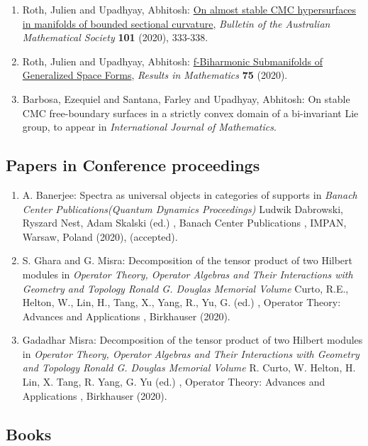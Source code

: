 \begin{enumerate}
\item Roth, Julien and Upadhyay, Abhitosh: \href{https://www.cambridge.org/core/journals/bulletin-of-the-australian-mathematical-society/article/on-almost-stable-cmc-hypersurfaces-in-manifolds-of-bounded-sectional-curvature/E0BF84D4D46C82F6D75CDCEAAF5DEE94}{On almost stable CMC hypersurfaces in manifolds of bounded sectional curvature}, \emph{Bulletin of the Australian Mathematical Society} {\bf 101} (2020), 333-338.
\item Roth, Julien and Upadhyay, Abhitosh: \href{https://link.springer.com/article/10.1007/s00025-019-1142-4?shared-article-renderer#citeas}{f-Biharmonic Submanifolds of Generalized Space Forms}, \emph{Results in Mathematics} {\bf 75} (2020).
\item Barbosa, Ezequiel and Santana, Farley and Upadhyay, Abhitosh: On stable CMC free-boundary surfaces in a strictly convex domain of a bi-invariant Lie group, to appear in \emph{International Journal of Mathematics}.
\end{enumerate}


\subsection{Papers in Conference proceedings}

\begin{enumerate}
\item A. Banerjee: Spectra as universal objects in categories of supports in {\em Banach Center Publications(Quantum Dynamics Proceedings)} Ludwik Dabrowski, Ryszard Nest, Adam Skalski (ed.) , Banach Center Publications , IMPAN, Warsaw, Poland (2020), (accepted).
\item S. Ghara and G. Misra: Decomposition of the tensor product of two Hilbert modules in {\em Operator Theory, Operator Algebras and Their Interactions with Geometry and Topology Ronald G. Douglas Memorial Volume} Curto, R.E., Helton, W., Lin, H., Tang, X., Yang, R., Yu, G. (ed.) , Operator Theory: Advances and Applications , Birkhauser (2020).
\item Gadadhar Misra: Decomposition of the tensor product of two Hilbert modules in {\em Operator Theory, Operator Algebras and Their Interactions with Geometry and Topology Ronald G. Douglas Memorial Volume} R. Curto, W. Helton, H. Lin, X. Tang, R. Yang, G. Yu (ed.) , Operator Theory: Advances and Applications , Birkhauser (2020).
\end{enumerate}


\subsection{Books}



